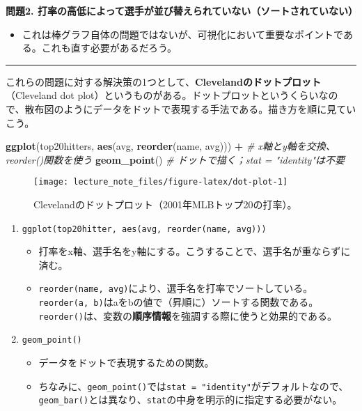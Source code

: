 \documentclass[]{book}
\newenvironment{Shaded}{\begin{snugshade}}{\end{snugshade}}
\newcommand{\KeywordTok}[1]{\textcolor[rgb]{0.13,0.29,0.53}{\textbf{#1}}}
\newcommand{\StringTok}[1]{\textcolor[rgb]{0.31,0.60,0.02}{#1}}
\newcommand{\CommentTok}[1]{\textcolor[rgb]{0.56,0.35,0.01}{\textit{#1}}}
\newcommand{\OperatorTok}[1]{\textcolor[rgb]{0.81,0.36,0.00}{\textbf{#1}}}
\newcommand{\NormalTok}[1]{#1}
\providecommand{\tightlist}{%
  \setlength{\itemsep}{0pt}\setlength{\parskip}{0pt}}
\begin{document}
\textbf{問題2.
打率の高低によって選手が並び替えられていない（ソートされていない）}

\begin{itemize}
\tightlist
\item
  これは棒グラフ自体の問題ではないが、可視化において重要なポイントである。これも直す必要があるだろう。
\end{itemize}

\begin{center}\rule{0.5\linewidth}{\linethickness}\end{center}

これらの問題に対する解決策の1つとして、\textbf{Clevelandのドットプロット}（Cleveland
dot
plot）というものがある。ドットプロットというくらいなので、散布図のようにデータをドットで表現する手法である。描き方を順に見ていこう。



\begin{Shaded}
\begin{Highlighting}[]
\KeywordTok{ggplot}\NormalTok{(top20hitters, }\KeywordTok{aes}\NormalTok{(avg, }\KeywordTok{reorder}\NormalTok{(name, avg))) }\OperatorTok{+}\StringTok{ }\CommentTok{# x軸とy軸を交換、reorder()関数を使う}
\StringTok{  }\KeywordTok{geom_point}\NormalTok{() }\CommentTok{# ドットで描く；stat = "identity"は不要}
\end{Highlighting}
\end{Shaded}

\begin{figure}

{\centering \texttt{[image: lecture\_note\_files/figure-latex/dot-plot-1]} 

}

\caption{Clevelandのドットプロット（2001年MLBトップ20の打率）。}\label{fig:dot-plot}
\end{figure}

\begin{enumerate}
\def\labelenumi{\arabic{enumi}.}
\item
  \texttt{ggplot(top20hitter,\ aes(avg,\ reorder(name,\ avg)))}

  \begin{itemize}
  \item
    打率をx軸、選手名をy軸にする。こうすることで、選手名が重ならずに済む。
  \item
    \texttt{reorder(name,\ avg)}により、選手名を打率でソートしている。\texttt{reorder(a,\ b)}はaをbの値で（昇順に）ソートする関数である。\texttt{reorder()}は、変数の\textbf{順序情報}を強調する際に使うと効果的である。
  \end{itemize}
\item
  \texttt{geom\_point()}

  \begin{itemize}
  \item
    データをドットで表現するための関数。
  \item
    ちなみに、\texttt{geom\_point()}では\texttt{stat\ =\ "identity"}がデフォルトなので、\texttt{geom\_bar()}とは異なり、\texttt{stat}の中身を明示的に指定する必要がない。
  \end{itemize}
\end{enumerate}
\end{document}
